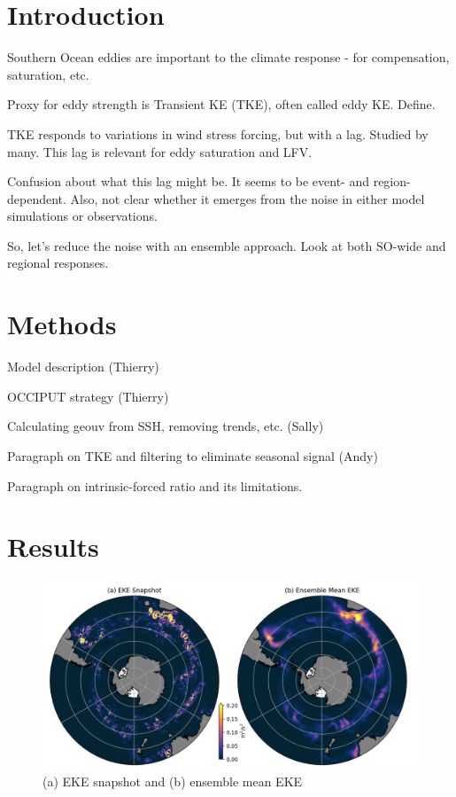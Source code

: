 \documentclass{agujournal2019-navid}
\begin{document}
%
%

\section{Introduction}

Southern Ocean eddies are important to the climate response - for compensation, saturation, etc.

Proxy for eddy strength is Transient KE (TKE), often called eddy KE. Define.

TKE responds to variations in wind stress forcing, but with a lag. Studied by many. This lag is relevant for eddy saturation and LFV.

Confusion about what this lag might be. It seems to be event- and region-dependent. Also, not clear whether it emerges from the noise in either model simulations or observations.

So, let’s reduce the noise with an ensemble approach. Look at both SO-wide and regional responses.


\section{Methods}

Model description (Thierry)

OCCIPUT strategy (Thierry)

Calculating geouv from SSH, removing trends, etc. (Sally)

Paragraph on TKE and filtering  to eliminate seasonal signal (Andy)

Paragraph on intrinsic-forced ratio and its limitations.


\section{Results}

\begin{figure}[t]
\begin{center}
\includegraphics[width=\hsize]{Figure1}
\caption{(a) EKE snapshot and (b) ensemble mean EKE  }
\label{default}
\end{center}
\end{figure}
\end{document}
